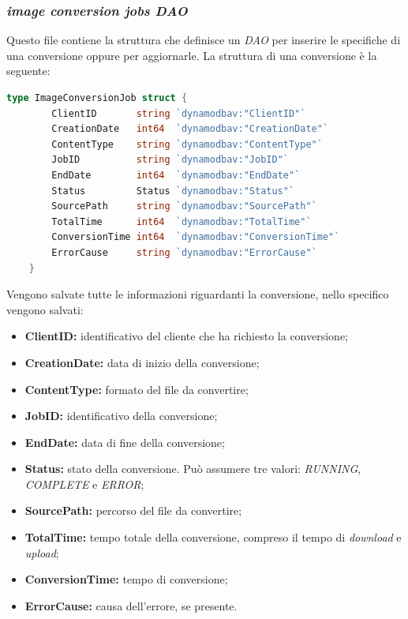\subsubsection{\emph{image conversion jobs DAO}}

Questo file contiene la struttura che definisce un \emph{DAO} per inserire le
specifiche di una conversione oppure per aggiornarle. La struttura di una
conversione è la seguente:
\begin{lstlisting}[language=go]
    type ImageConversionJob struct {
        ClientID       string `dynamodbav:"ClientID"`
        CreationDate   int64  `dynamodbav:"CreationDate"`
        ContentType    string `dynamodbav:"ContentType"`
        JobID          string `dynamodbav:"JobID"`
        EndDate        int64  `dynamodbav:"EndDate"`
        Status         Status `dynamodbav:"Status"`
        SourcePath     string `dynamodbav:"SourcePath"`
        TotalTime      int64  `dynamodbav:"TotalTime"`
        ConversionTime int64  `dynamodbav:"ConversionTime"`
        ErrorCause     string `dynamodbav:"ErrorCause"`
    }
\end{lstlisting}

Vengono salvate tutte le informazioni riguardanti la conversione, nello
specifico vengono salvati:
\begin{itemize}
      \item \textbf{ClientID:} identificativo del cliente che ha richiesto la
            conversione;
      \item \textbf{CreationDate:} data di inizio della conversione;
      \item \textbf{ContentType:} formato del file da convertire;
      \item \textbf{JobID:} identificativo della conversione;
      \item \textbf{EndDate:} data di fine della conversione;
      \item \textbf{Status:} stato della conversione. Può assumere tre valori: \emph{RUNNING}, \emph{COMPLETE} e \emph{ERROR};
      \item \textbf{SourcePath:} percorso del file da convertire;
      \item \textbf{TotalTime:} tempo totale della conversione, compreso il tempo
            di \emph{download} e \emph{upload};
      \item \textbf{ConversionTime:} tempo di conversione;
      \item \textbf{ErrorCause:} causa dell'errore, se presente.
\end{itemize}

